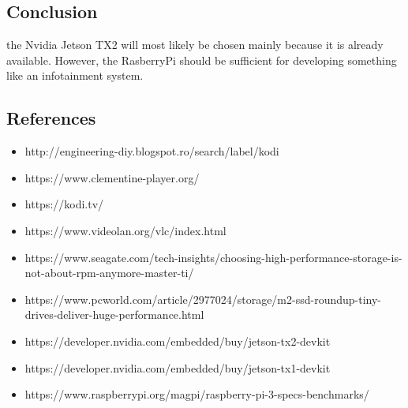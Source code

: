\documentclass[onecolumn, draftclsnofoot,10pt, compsoc]{IEEEtran}
\begin{document}
\subsection{Conclusion}
the Nvidia Jetson TX2 will most likely be chosen mainly because it is already available. However, the RasberryPi should be sufficient for developing something like an infotainment system.

\subsection{References}
\begin{itemize}
    \item http://engineering-diy.blogspot.ro/search/label/kodi

    \item https://www.clementine-player.org/
    \item https://kodi.tv/
    \item https://www.videolan.org/vlc/index.html

    \item https://www.seagate.com/tech-insights/choosing-high-performance-storage-is-not-about-rpm-anymore-master-ti/
    \item https://www.pcworld.com/article/2977024/storage/m2-ssd-roundup-tiny-drives-deliver-huge-performance.html

    \item https://developer.nvidia.com/embedded/buy/jetson-tx2-devkit
    \item https://developer.nvidia.com/embedded/buy/jetson-tx1-devkit
    \item https://www.raspberrypi.org/magpi/raspberry-pi-3-specs-benchmarks/
\end{itemize}
\end{document}
